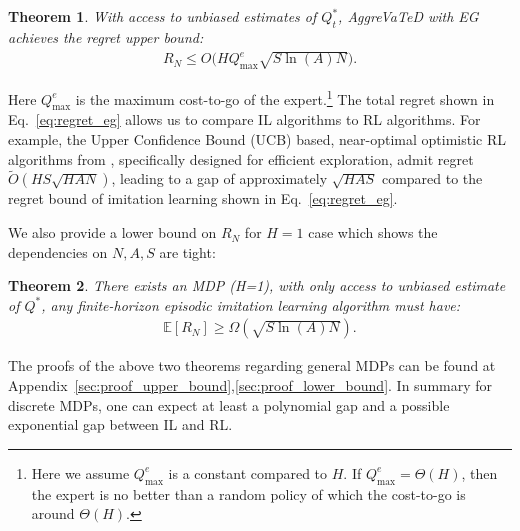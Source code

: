 \documentclass{article}
\newtheorem{theorem}{Theorem}[section]
\begin{document}
\begin{theorem}
\label{them:upper_bound}
With access to unbiased estimates of $Q^*_t$, AggreVaTeD with EG achieves the regret upper bound:
\begin{align}
\label{eq:regret_eg}
R_N \leq O\big(HQ_{\max}^e\sqrt{S\ln(A)N}\big).
\end{align}
\end{theorem} Here $Q_{\max}^e$ is the maximum cost-to-go of the expert.\footnote{Here we assume $Q_{\max}^e$ is a constant compared to $H$. If $Q_{\max}^e=\Theta(H)$, then the expert is no better than a random policy of which the cost-to-go is around $\Theta(H)$.}
The total regret shown in Eq.~\ref{eq:regret_eg} allows us to compare IL algorithms to RL algorithms. For example, the Upper Confidence Bound (UCB) based, near-optimal optimistic RL algorithms from \cite{jaksch2010near}, specifically designed for efficient exploration, admit regret $\tilde{O}(HS\sqrt{H AN})$, leading to a gap of approximately $\sqrt{HAS}$ compared to the regret bound of imitation learning shown in Eq.~\ref{eq:regret_eg}. 

We also provide a lower bound on $R_N$ for $H=1$ case which shows the dependencies on $N, A, S$ are tight:
\begin{theorem}
\label{them:lower_bound}
There exists an MDP (H=1), with only access to unbiased estimate of $Q^*$, any finite-horizon episodic imitation learning algorithm  must have:
\begin{align}
\mathbb{E}[R_N] \geq \Omega(\sqrt{S\ln({A})N}).
\end{align}
\end{theorem} The proofs of the above two theorems regarding general MDPs can be found at Appendix~\ref{sec:proof_upper_bound},\ref{sec:proof_lower_bound}. In summary for discrete MDPs, one can expect at least a polynomial gap and a possible exponential gap between IL and RL.



\vspace{-5pt}
\end{document}
